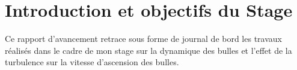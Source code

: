 \section{Introduction et objectifs du Stage}
Ce rapport d'avancement retrace sous forme de journal de bord les travaux réalisés dans le cadre de mon stage sur la dynamique des bulles et l'effet de la turbulence sur la vitesse d'ascension des bulles.